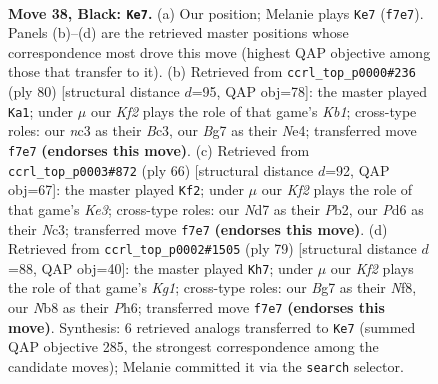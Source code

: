 \documentclass[11pt]{article}
\begin{document}
\clearpage

\begin{figure}[p]\centering
\begin{subfigure}{0.46\textwidth}\centering
\resizebox{\linewidth}{!}{%
\newchessgame
\chessboard[
  setfen={rnR5/3n1kb1/p2p4/3P3Q/6P1/q1N5/4N3/4K3 b - - 7 38},
  showmover=false,
  pgfstyle=straightmove, color=movearrow, markmove={f7-e7}
]}
\caption{}
\end{subfigure}\hfill
\begin{subfigure}{0.46\textwidth}\centering
\resizebox{\linewidth}{!}{%
\newchessgame
\chessboard[
  setfen={2kn4/1p2bp1Q/7P/p1P4r/4N3/2Bq4/1P6/1K2R3 w - - 1 41},
  showmover=false,
  pgfstyle=straightmove, color=movearrow, markmove={b1-a1}
]}
\caption{}
\end{subfigure}
\\[4pt]
\begin{subfigure}{0.46\textwidth}\centering
\resizebox{\linewidth}{!}{%
\newchessgame
\chessboard[
  setfen={5rk1/5p1n/BnQ3p1/6q1/4P3/2N1K3/1PP5/3R4 w - - 8 34},
  showmover=false,
  pgfstyle=straightmove, color=movearrow, markmove={e3-f2}
]}
\caption{}
\end{subfigure}\hfill
\begin{subfigure}{0.46\textwidth}\centering
\resizebox{\linewidth}{!}{%
\newchessgame
\chessboard[
  setfen={3r1nk1/1q4p1/7p/4p3/R1Q1P3/3nP1PP/3N3N/6K1 b - - 1 40},
  showmover=false,
  pgfstyle=straightmove, color=movearrow, markmove={g8-h7}
]}
\caption{}
\end{subfigure}
\caption{\textbf{Move 38, Black: \texttt{Ke7}.} (a) Our position; Melanie plays \texttt{Ke7} (\texttt{f7e7}). Panels (b)--(d) are the retrieved master positions whose correspondence most drove this move (highest QAP objective among those that transfer to it). (b) Retrieved from \texttt{ccrl\_top\_p0000\#236} (ply 80) [structural distance $d$=95, QAP obj=78]: the master played \texttt{Ka1}; under $\mu$ our \emph{Kf2} plays the role of that game's \emph{Kb1}; cross-type roles: our \emph{n}c3 as their \emph{B}c3, our \emph{B}g7 as their \emph{N}e4; transferred move \texttt{f7e7} \textbf{(endorses this move)}. (c) Retrieved from \texttt{ccrl\_top\_p0003\#872} (ply 66) [structural distance $d$=92, QAP obj=67]: the master played \texttt{Kf2}; under $\mu$ our \emph{Kf2} plays the role of that game's \emph{Ke3}; cross-type roles: our \emph{N}d7 as their \emph{P}b2, our \emph{P}d6 as their \emph{N}c3; transferred move \texttt{f7e7} \textbf{(endorses this move)}. (d) Retrieved from \texttt{ccrl\_top\_p0002\#1505} (ply 79) [structural distance $d$=88, QAP obj=40]: the master played \texttt{Kh7}; under $\mu$ our \emph{Kf2} plays the role of that game's \emph{Kg1}; cross-type roles: our \emph{B}g7 as their \emph{N}f8, our \emph{N}b8 as their \emph{P}h6; transferred move \texttt{f7e7} \textbf{(endorses this move)}. Synthesis: 6 retrieved analogs transferred to \texttt{Ke7} (summed QAP objective 285, the strongest correspondence among the candidate moves); Melanie committed it via the \texttt{search} selector.}
\label{fig:thought-m75}
\end{figure}
\end{document}
